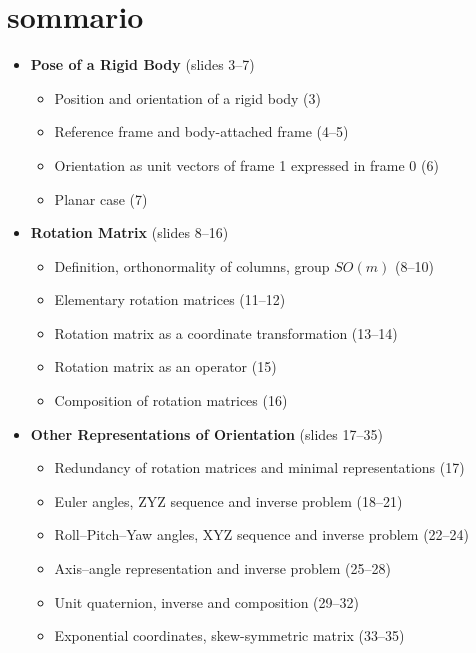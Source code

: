 


\section{sommario}

\begin{itemize}
    \item \textbf{Pose of a Rigid Body} (slides 3--7)
    \begin{itemize}
        \item Position and orientation of a rigid body (3)
        \item Reference frame and body-attached frame (4--5)
        \item Orientation as unit vectors of frame 1 expressed in frame 0 (6)
        \item Planar case (7)
    \end{itemize}

    \item \textbf{Rotation Matrix} (slides 8--16)
    \begin{itemize}
        \item Definition, orthonormality of columns, group $SO(m)$ (8--10)
        \item Elementary rotation matrices (11--12)
        \item Rotation matrix as a coordinate transformation (13--14)
        \item Rotation matrix as an operator (15)
        \item Composition of rotation matrices (16)
    \end{itemize}

    \item \textbf{Other Representations of Orientation} (slides 17--35)
    \begin{itemize}
        \item Redundancy of rotation matrices and minimal representations (17)
        \item Euler angles, ZYZ sequence and inverse problem (18--21)
        \item Roll--Pitch--Yaw angles, XYZ sequence and inverse problem (22--24)
        \item Axis--angle representation and inverse problem (25--28)
        \item Unit quaternion, inverse and composition (29--32)
        \item Exponential coordinates, skew-symmetric matrix (33--35)
    \end{itemize}


\end{itemize}
